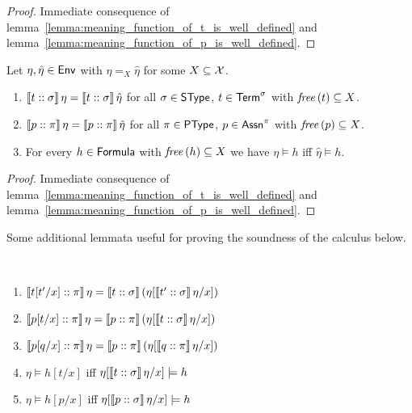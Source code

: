 \documentclass[12pt,a4paper]{report}
\begin{document}
\begin{proof}
  Immediate consequence of lemma~\ref{lemma:meaning_function_of_t_is_well_defined}
  and lemma~\ref{lemma:meaning_function_of_p_is_well_defined}.
\end{proof}

\begin{theorem}[Coincidence] \label{theorem:coincidence}
  Let $\eta,\hat{\eta}\in\mathsf{Env}$ with $\eta =_X \hat{\eta}$ for some $X \subseteq \mathcal{X}$.
  \begin{enumerate}
    \item $\llbracket{t}\mathrel{::}{\sigma}\rrbracket\,\eta = \llbracket{t}\mathrel{::}{\sigma}\rrbracket\,\hat{\eta}$
          for all $\sigma\in\mathsf{SType}$, $t \in\mathsf{Term}^\sigma$ with $\mathit{free}\,(t) \subseteq X$.
    \item $\llbracket{p}\mathrel{::}{\pi}\rrbracket\,\eta = \llbracket{p}\mathrel{::}{\pi}\rrbracket\,\hat{\eta}$
          for all $\pi\in\mathsf{PType}$, $p \in \mathsf{Assn}^\pi$ with $\mathit{free}\,(p) \subseteq X$.
    \item For every $h \in \mathsf{Formula}$
          with $\mathit{free}\,(h) \subseteq X$ we have $\eta \models h$ iff $\hat{\eta} \models h$.
  \end{enumerate}
\end{theorem}

\begin{proof}
  Immediate consequence of lemma~\ref{lemma:meaning_function_of_t_is_well_defined}
  and lemma~\ref{lemma:meaning_function_of_p_is_well_defined}.
\end{proof}

Some additional lemmata useful for proving the soundness of the calculus below.

\begin{lemma}[Substitution] \label{lemma:Substitution}
  \
  \begin{enumerate}
    \item $\llbracket{t[t'/x]}\mathrel{::}{\pi}\rrbracket\,\eta
           = \llbracket{t}\mathrel{::}{\sigma}\rrbracket\,(\eta[\llbracket{t'}\mathrel{::}{\sigma}\rrbracket\,\eta/x])$
    \item $\llbracket{p[t/x]}\mathrel{::}{\pi}\rrbracket\,\eta
           = \llbracket{p}\mathrel{::}{\pi}\rrbracket\,(\eta[\llbracket{t}\mathrel{::}{\sigma}\rrbracket\,\eta/x])$
    \item $\llbracket{p[q/x]}\mathrel{::}{\pi}\rrbracket\,\eta
           = \llbracket{p}\mathrel{::}{\pi}\rrbracket\,(\eta[\llbracket{q}\mathrel{::}{\pi}\rrbracket\,\eta/x])$
    \item $\eta \models h[t/x]$ iff $\eta[\llbracket{t}\mathrel{::}{\sigma}\rrbracket\,\eta/x] \models h$
    \item $\eta \models h[p/x]$ iff $\eta[\llbracket{p}\mathrel{::}{\sigma}\rrbracket\,\eta/x] \models h$
  \end{enumerate}
\end{lemma}
\end{document}
